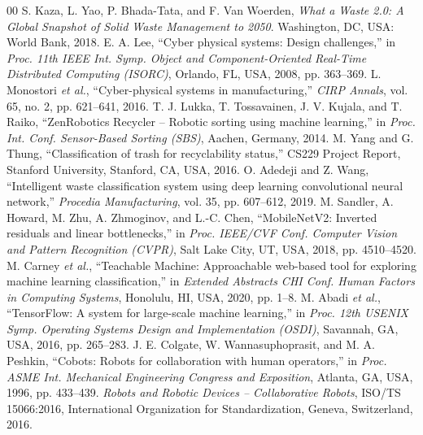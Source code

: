 \documentclass[conference]{IEEEtran}
\begin{document}

\begin{thebibliography}{00}
 S. Kaza, L. Yao, P. Bhada-Tata, and F. Van Woerden, \emph{What a Waste 2.0: A Global Snapshot of Solid Waste Management to 2050}. Washington, DC, USA: World Bank, 2018.
 E. A. Lee, ``Cyber physical systems: Design challenges,'' in \emph{Proc. 11th IEEE Int. Symp. Object and Component-Oriented Real-Time Distributed Computing (ISORC)}, Orlando, FL, USA, 2008, pp. 363--369.
 L. Monostori \emph{et al.}, ``Cyber-physical systems in manufacturing,'' \emph{CIRP Annals}, vol. 65, no. 2, pp. 621--641, 2016.
 T. J. Lukka, T. Tossavainen, J. V. Kujala, and T. Raiko, ``ZenRobotics Recycler -- Robotic sorting using machine learning,'' in \emph{Proc. Int. Conf. Sensor-Based Sorting (SBS)}, Aachen, Germany, 2014.
 M. Yang and G. Thung, ``Classification of trash for recyclability status,'' CS229 Project Report, Stanford University, Stanford, CA, USA, 2016.
 O. Adedeji and Z. Wang, ``Intelligent waste classification system using deep learning convolutional neural network,'' \emph{Procedia Manufacturing}, vol. 35, pp. 607--612, 2019.
 M. Sandler, A. Howard, M. Zhu, A. Zhmoginov, and L.-C. Chen, ``MobileNetV2: Inverted residuals and linear bottlenecks,'' in \emph{Proc. IEEE/CVF Conf. Computer Vision and Pattern Recognition (CVPR)}, Salt Lake City, UT, USA, 2018, pp. 4510--4520.
 M. Carney \emph{et al.}, ``Teachable Machine: Approachable web-based tool for exploring machine learning classification,'' in \emph{Extended Abstracts CHI Conf. Human Factors in Computing Systems}, Honolulu, HI, USA, 2020, pp. 1--8.
 M. Abadi \emph{et al.}, ``TensorFlow: A system for large-scale machine learning,'' in \emph{Proc. 12th USENIX Symp. Operating Systems Design and Implementation (OSDI)}, Savannah, GA, USA, 2016, pp. 265--283.
 J. E. Colgate, W. Wannasuphoprasit, and M. A. Peshkin, ``Cobots: Robots for collaboration with human operators,'' in \emph{Proc. ASME Int. Mechanical Engineering Congress and Exposition}, Atlanta, GA, USA, 1996, pp. 433--439.
 \emph{Robots and Robotic Devices -- Collaborative Robots}, ISO/TS 15066:2016, International Organization for Standardization, Geneva, Switzerland, 2016.

\end{thebibliography}
\end{document}
